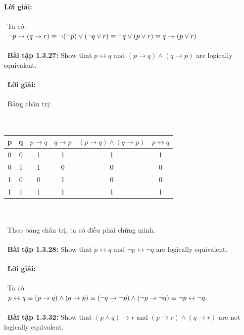 \documentclass[a4paper]{article}
\begin{document}
\textbf{Lời giải: } \\\ \\\
Ta có: \\\
$\lnot p \rightarrow (q \rightarrow r) \\\equiv \lnot (\lnot p) \lor (\lnot q \lor r) \\\equiv \lnot q \lor (p \lor r) \\\equiv q \rightarrow (p \lor r)$ \\\ \\\
\textbf{Bài tập 1.3.27: }Show that $p \leftrightarrow q$ and $(p \rightarrow q) \land (q \rightarrow p)$ are logically equivalent. \\\ \\\
\textbf{Lời giải: }\\\ \\\
Bảng chân trị: \\\ \\\
\begin{tabular}{|c|c|c|c|c|c|}
\hline 
p & q & $p \rightarrow q$ & $q \rightarrow p$ & $(p \rightarrow q) \land (q \rightarrow p)$ & $p \leftrightarrow q$ \\ 
\hline 
0 & 0 & 1 & 1 & 1 & 1 \\ 
\hline 
0 & 1 & 1 & 0 & 0 & 0 \\ 
\hline 
1 & 0 & 0 & 1 & 0 & 0 \\ 
\hline 
1 & 1 & 1 & 1 & 1 & 1 \\ 
\hline 
\end{tabular} \\\ \\\
Theo bảng chân trị, ta có điều phải chứng minh. \\\ \\\
\textbf{Bài tập 1.3.28: }Show that $p \leftrightarrow q$ and $\lnot p \leftrightarrow \lnot q$ are logically equivalent. \\\ \\\
\textbf{Lời giải: } \\\ \\\
Ta có: \\\ 
$p \leftrightarrow q \\\equiv (p \rightarrow q) \land (q \rightarrow p) \\\equiv (\lnot q \rightarrow \lnot p) \land (\lnot p \rightarrow \lnot q) \\\equiv \lnot p \leftrightarrow \lnot q.$ \\\ \\\
\textbf{Bài tập 1.3.32: }Show that $(p \land q) \rightarrow r$ and $(p \rightarrow r) \land (q \rightarrow r)$ are not logically equivalent. \\\ \\\
\end{document}
